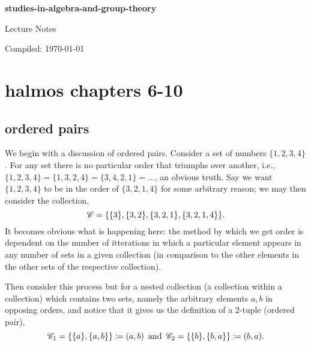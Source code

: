 \documentclass[12pt,oneside]{report}
\begin{document}
\begin{titlepage}
    \centering
    \vspace*{2cm}
    {\Huge\bfseries studies-in-algebra-and-group-theory\par}
    \vspace{1cm}
    {\Large Lecture Notes\par}
    \vspace{2cm}
    {\Large Compiled: \today\par}
\end{titlepage}

\tableofcontents
\newpage

\pagestyle{head}




\section{halmos chapters 6-10}


\subsection{ordered pairs}
We begin with a discussion of ordered pairs. Consider a set of numbers \( \{1,2,3,4\}   \). For any set there is no particular order that triumphs over another, i.e., \( \{1,2,3,4\} = \{1,3,2,4\} = \{3,4,2,1\} =\ldots     \), an obvious truth. Say we want \( \{1,2,3,4\}   \) to be in the order of \( \{3,2,1,4\}   \) for some arbitrary reason; we may then consider the collection,
\[
  {\mathscr{C}} = \{\{3\} , \{3,2\} ,\{3,2,1\} , \{3,2,1,4\}     \}
.\] 
It becomes obvious what is happening here: the method by which we get order is dependent on the number of itterations in which a particular element appears in any number of sets in a given collection (in comparison to the other elements in the other sets of the respective collection). 

Then consider this process but for a nested collection (a collection within a collection) which contains two sets, namely the arbitrary elements \( a,b \) in opposing orders, and notice that it gives us the definition of a 2-tuple (ordered pair),
\[
  {\mathscr{C}}_{1} = \{\{a\} ,\{a,b\}   \} \coloneqq (a,b) \, \text{ and }\, {\mathscr{C}}_{2}  = \{\{b\} ,\{b,a\}   \} \coloneqq  (b,a)  
.\] 
\end{document}
